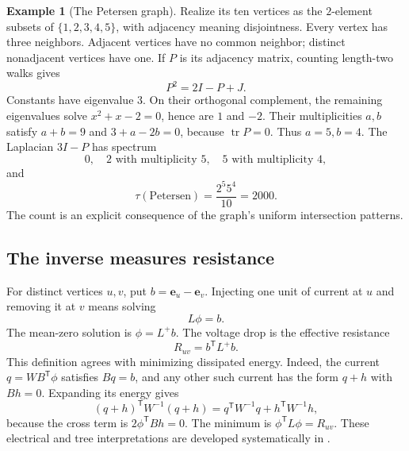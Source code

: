 \documentclass[11pt]{article}
\theoremstyle{definition}
\newtheorem{example}[theorem]{Example}
\theoremstyle{remark}
\begin{document}
\begin{example}[The Petersen graph]\label{ex:glin-petersen}
Realize its ten vertices as the $2$-element subsets of $\{1,2,3,4,5\}$, with adjacency meaning disjointness. Every vertex has three neighbors. Adjacent vertices have no common neighbor; distinct nonadjacent vertices have one. If $P$ is its adjacency matrix, counting length-two walks gives
\[
 P^2=2I-P+J.
\]
Constants have eigenvalue $3$. On their orthogonal complement, the remaining eigenvalues solve $x^2+x-2=0$, hence are $1$ and $-2$. Their multiplicities $a,b$ satisfy $a+b=9$ and $3+a-2b=0$, because $\operatorname{tr}P=0$. Thus $a=5,b=4$. The Laplacian $3I-P$ has spectrum
\[
 0,\quad 2\text{ with multiplicity }5,\quad
 5\text{ with multiplicity }4,
\]
and
\[
 \tau(\text{Petersen})=\frac{2^5 5^4}{10}=2000.
\]
The count is an explicit consequence of the graph's uniform intersection patterns.
\end{example}

\subsection{The inverse measures resistance}

For distinct vertices $u,v$, put $b=\mathbf e_u-\mathbf e_v$. Injecting one unit of current at $u$ and removing it at $v$ means solving
\[
 L\phi=b.
\]
The mean-zero solution is $\phi=L^+b$. The voltage drop is the effective resistance
\begin{equation}\label{eq:glin-resistance}
 R_{uv}=b^{\mathsf T}L^+b.
\end{equation}
This definition agrees with minimizing dissipated energy. Indeed, the current $q=W B^{\mathsf T}\phi$ satisfies $Bq=b$, and any other such current has the form $q+h$ with $Bh=0$. Expanding its energy gives
\[
 (q+h)^{\mathsf T}W^{-1}(q+h)
 =q^{\mathsf T}W^{-1}q+h^{\mathsf T}W^{-1}h,
\]
because the cross term is $2\phi^{\mathsf T}Bh=0$. The minimum is $\phi^{\mathsf T}L\phi=R_{uv}$. These electrical and tree interpretations are developed systematically in \cite{glinLyonsPeres2016}.
\end{document}

